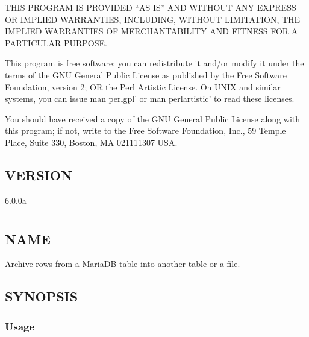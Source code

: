 \documentclass[letterpaper,10pt,english]{sphinxmanual}
\begin{document}
\sphinxAtStartPar
THIS PROGRAM IS PROVIDED “AS IS” AND WITHOUT ANY EXPRESS OR IMPLIED
WARRANTIES, INCLUDING, WITHOUT LIMITATION, THE IMPLIED WARRANTIES OF
MERCHANTABILITY AND FITNESS FOR A PARTICULAR PURPOSE.

\sphinxAtStartPar
This program is free software; you can redistribute it and/or modify it under
the terms of the GNU General Public License as published by the Free Software
Foundation, version 2; OR the Perl Artistic License.  On UNIX and similar
systems, you can issue \textasciigrave{}man perlgpl’ or \textasciigrave{}man perlartistic’ to read these
licenses.

\sphinxAtStartPar
You should have received a copy of the GNU General Public License along with
this program; if not, write to the Free Software Foundation, Inc., 59 Temple
Place, Suite 330, Boston, MA  02111\sphinxhyphen{}1307  USA.


\section{VERSION}
\label{\detokenize{mariadb-align-output:version}}
\sphinxAtStartPar
{} 6.0.0a


\chapter{}
\label{\detokenize{mariadb-archiver:mariadb-archiver}}\label{\detokenize{mariadb-archiver::doc}}

\section{NAME}
\label{\detokenize{mariadb-archiver:name}}
\sphinxAtStartPar
{} \sphinxhyphen{} Archive rows from a MariaDB table into another table or a file.


\section{SYNOPSIS}
\label{\detokenize{mariadb-archiver:synopsis}}

\subsection{Usage}
\label{\detokenize{mariadb-archiver:usage}}
\begin{sphinxVerbatim}[commandchars=\\\{\}]
 \PYG{p}{[}\PYG{p}{]}    
\end{sphinxVerbatim}
\end{document}
